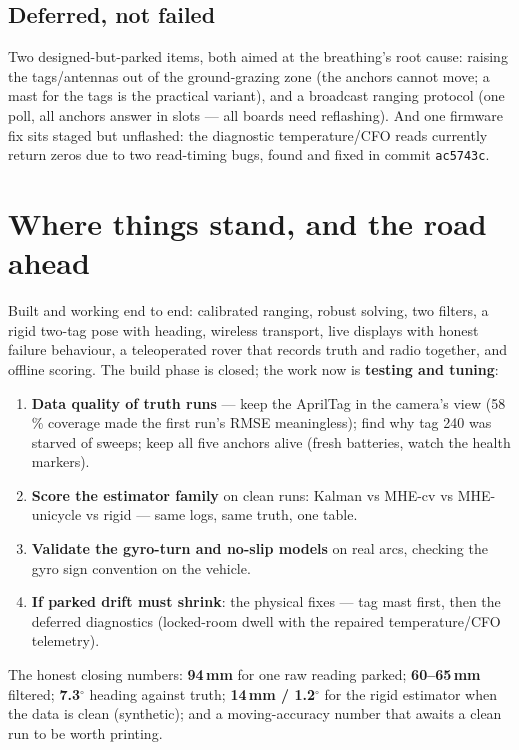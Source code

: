 \documentclass[11pt,a4paper]{article}
\newcommand{\code}[1]{\texttt{#1}}
\begin{document}
\subsection{Deferred, not failed}
Two designed-but-parked items, both aimed at the breathing's root cause: raising
the tags/antennas out of the ground-grazing zone (the anchors cannot move; a mast
for the tags is the practical variant), and a broadcast ranging protocol (one
poll, all anchors answer in slots --- all boards need reflashing). And one
firmware fix sits staged but unflashed: the diagnostic temperature/CFO reads
currently return zeros due to two read-timing bugs, found and fixed in commit
\code{ac5743c}.

\section{Where things stand, and the road ahead}
\label{sec:roadmap}

Built and working end to end: calibrated ranging, robust solving, two filters, a
rigid two-tag pose with heading, wireless transport, live displays with honest
failure behaviour, a teleoperated rover that records truth and radio together, and
offline scoring. The build phase is closed; the work now is
\textbf{testing and tuning}:

\begin{enumerate}
\item \textbf{Data quality of truth runs} --- keep the AprilTag in the camera's
      view (58\,\% coverage made the first run's RMSE meaningless); find why tag
      240 was starved of sweeps; keep all five anchors alive (fresh batteries,
      watch the health markers).
\item \textbf{Score the estimator family} on clean runs: Kalman vs MHE-cv vs
      MHE-unicycle vs rigid --- same logs, same truth, one table.
\item \textbf{Validate the gyro-turn and no-slip models} on real arcs, checking
      the gyro sign convention on the vehicle.
\item \textbf{If parked drift must shrink}: the physical fixes --- tag mast
      first, then the deferred diagnostics (locked-room dwell with the repaired
      temperature/CFO telemetry).
\end{enumerate}

The honest closing numbers: \textbf{94\,mm} for one raw reading parked;
\textbf{60--65\,mm} filtered; \textbf{7.3$^\circ$} heading against truth;
\textbf{14\,mm / 1.2$^\circ$} for the rigid estimator when the data is clean
(synthetic); and a moving-accuracy number that awaits a clean run to be worth
printing.
\end{document}
